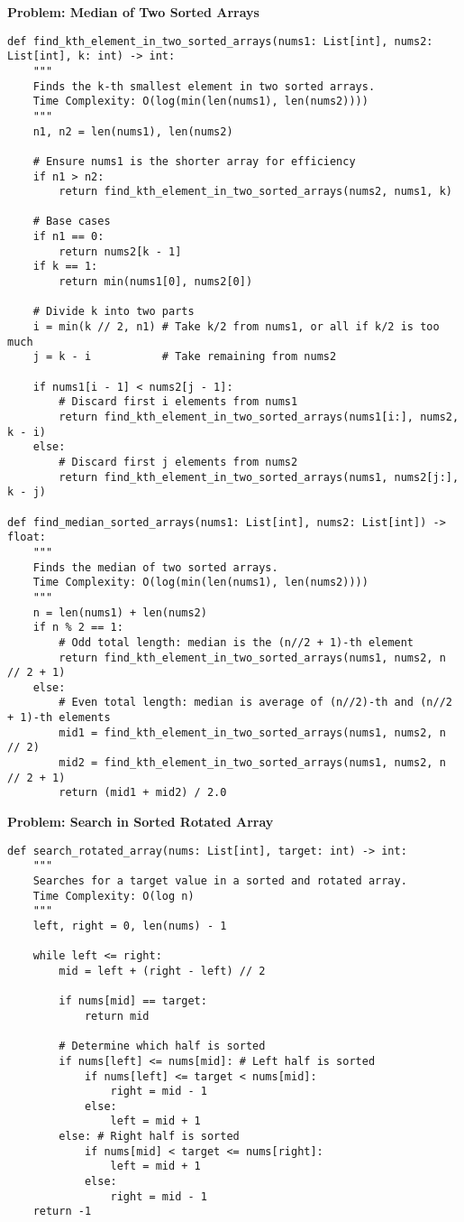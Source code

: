 \noindent\textbf{Problem: Median of Two Sorted Arrays}
\begin{verbatim}
def find_kth_element_in_two_sorted_arrays(nums1: List[int], nums2: List[int], k: int) -> int:
    """
    Finds the k-th smallest element in two sorted arrays.
    Time Complexity: O(log(min(len(nums1), len(nums2))))
    """
    n1, n2 = len(nums1), len(nums2)

    # Ensure nums1 is the shorter array for efficiency
    if n1 > n2:
        return find_kth_element_in_two_sorted_arrays(nums2, nums1, k)

    # Base cases
    if n1 == 0:
        return nums2[k - 1]
    if k == 1:
        return min(nums1[0], nums2[0])

    # Divide k into two parts
    i = min(k // 2, n1) # Take k/2 from nums1, or all if k/2 is too much
    j = k - i           # Take remaining from nums2

    if nums1[i - 1] < nums2[j - 1]:
        # Discard first i elements from nums1
        return find_kth_element_in_two_sorted_arrays(nums1[i:], nums2, k - i)
    else:
        # Discard first j elements from nums2
        return find_kth_element_in_two_sorted_arrays(nums1, nums2[j:], k - j)

def find_median_sorted_arrays(nums1: List[int], nums2: List[int]) -> float:
    """
    Finds the median of two sorted arrays.
    Time Complexity: O(log(min(len(nums1), len(nums2))))
    """
    n = len(nums1) + len(nums2)
    if n % 2 == 1:
        # Odd total length: median is the (n//2 + 1)-th element
        return find_kth_element_in_two_sorted_arrays(nums1, nums2, n // 2 + 1)
    else:
        # Even total length: median is average of (n//2)-th and (n//2 + 1)-th elements
        mid1 = find_kth_element_in_two_sorted_arrays(nums1, nums2, n // 2)
        mid2 = find_kth_element_in_two_sorted_arrays(nums1, nums2, n // 2 + 1)
        return (mid1 + mid2) / 2.0
\end{verbatim}

\noindent\textbf{Problem: Search in Sorted Rotated Array}
\begin{verbatim}
def search_rotated_array(nums: List[int], target: int) -> int:
    """
    Searches for a target value in a sorted and rotated array.
    Time Complexity: O(log n)
    """
    left, right = 0, len(nums) - 1

    while left <= right:
        mid = left + (right - left) // 2

        if nums[mid] == target:
            return mid

        # Determine which half is sorted
        if nums[left] <= nums[mid]: # Left half is sorted
            if nums[left] <= target < nums[mid]:
                right = mid - 1
            else:
                left = mid + 1
        else: # Right half is sorted
            if nums[mid] < target <= nums[right]:
                left = mid + 1
            else:
                right = mid - 1
    return -1
\end{verbatim}

